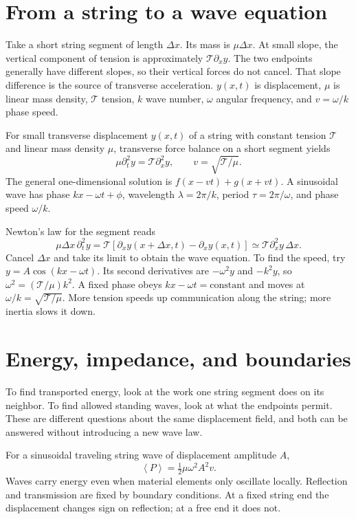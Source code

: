 \documentclass[11pt,oneside]{book}
\newcommand{\avg}[1]{\left\langle #1\right\rangle}
\theoremstyle{reviewstyle}
\begin{document}
\section{From a string to a wave equation}
Take a short string segment of length $\Delta x$. Its mass is $\mu\Delta x$. At small slope, the vertical component of tension is approximately $\mathcal T\partial_xy$. The two endpoints generally have different slopes, so their vertical forces do not cancel. That slope difference is the source of transverse acceleration. $y(x,t)$ is displacement, $\mu$ is linear mass density, $\mathcal T$ tension, $k$ wave number, $\omega$ angular frequency, and $v=\omega/k$ phase speed.

For small transverse displacement $y(x,t)$ of a string with constant tension $\mathcal T$ and linear mass density $\mu$, transverse force balance on a short segment yields
\begin{equation}
\mu\partial_t^2y=\mathcal T\partial_x^2y,\qquad v=\sqrt{\mathcal T/\mu}.
\end{equation}
The general one-dimensional solution is $f(x-vt)+g(x+vt)$. A sinusoidal wave has phase $kx-\omega t+\phi$, wavelength $\lambda=2\pi/k$, period $\tau=2\pi/\omega$, and phase speed $\omega/k$.

Newton's law for the segment reads
\begin{equation}
\mu\Delta x\,\partial_t^2y
=\mathcal T[\partial_xy(x+\Delta x,t)-\partial_xy(x,t)]
\simeq\mathcal T\partial_x^2y\,\Delta x.
\end{equation}
Cancel $\Delta x$ and take its limit to obtain the wave equation. To find the speed, try $y=A\cos(kx-\omega t)$. Its second derivatives are $-\omega^2y$ and $-k^2y$, so $\omega^2=(\mathcal T/\mu)k^2$. A fixed phase obeys $kx-\omega t=\text{constant}$ and moves at $\omega/k=\sqrt{\mathcal T/\mu}$. More tension speeds up communication along the string; more inertia slows it down.

\section{Energy, impedance, and boundaries}
To find transported energy, look at the work one string segment does on its neighbor. To find allowed standing waves, look at what the endpoints permit. These are different questions about the same displacement field, and both can be answered without introducing a new wave law.

For a sinusoidal traveling string wave of displacement amplitude $A$,
\begin{equation}
\avg{P}=\tfrac12\mu\omega^2A^2v.
\end{equation}
Waves carry energy even when material elements only oscillate locally. Reflection and transmission are fixed by boundary conditions. At a fixed string end the displacement changes sign on reflection; at a free end it does not.
\end{document}
